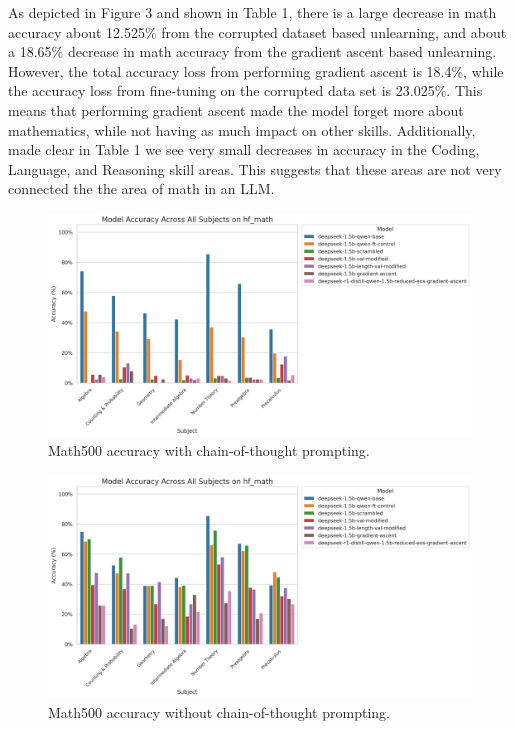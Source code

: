 \documentclass[10.5pt]{article}
\begin{document}
As depicted in Figure 3 and shown in Table 1, there is a large decrease in math accuracy about 12.525\% from the corrupted dataset based unlearning, and about a 18.65\% decrease in math accuracy from the gradient ascent based unlearning. However, the total accuracy loss from performing gradient ascent is 18.4\%, while the accuracy loss from fine-tuning on the corrupted data set is 23.025\%. This means that performing gradient ascent made the model forget more about mathematics, while not having as much impact on other skills. Additionally, made clear in Table 1 we see very small decreases in accuracy in the Coding, Language, and Reasoning skill areas. This suggests that these areas are not very connected the the area of math in an LLM.
\begin{figure}[h]
    \centering
    \includegraphics[width=0.9\linewidth]{main_prompt_hf_math_accuracy_all_subjects_combined_20250505_042444.png}
    \caption{Math500 accuracy with chain-of-thought prompting.}
    \label{fig:math500_cot}
\end{figure}
\begin{figure}[h]
    \centering
    \includegraphics[width=0.9\linewidth]{new_prompt_hf_math_accuracy_all_subjects_combined_20250505_210815.png}
    \caption{Math500 accuracy without chain-of-thought prompting.}
    \label{fig:math500_cot}
\end{figure}
\end{document}

